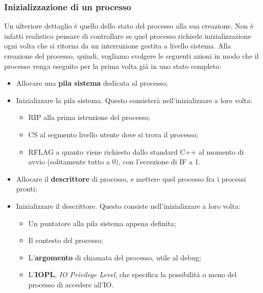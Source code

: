 \documentclass[a4paper,11pt]{article}
\begin{document}
\subsubsection{Inizializzazione di un processo}
Un ulteriore dettaglio è quello dello stato del processo alla sua creazione.
Non è infatti realistico pensare di controllare se quel processo richiede inizializzazione ogni volta che si ritorna da un interruzione gestita a livello sistema.
Alla creazione del processo, quindi, vogliamo svolgere le seguenti azioni in modo che il processo venga eseguito per la prima volta già in uno stato completo:
\begin{itemize}
	\item Allocare una \textbf{pila sistema} dedicata al processo;
	\item Inizializzare la pila sistema. Questo consisterà nell'inizializzare a loro volta: 
		\begin{itemize}
			\item RIP alla prima istruzione del processo;
			\item CS al segmento livello utente dove si trova il processo;
			\item RFLAG a quanto viene richiesto dallo standard C++ al momento di avvio (solitamente tutto a 0), con l'eccezione di IF a 1.
		\end{itemize}
	\item Allocare il \textbf{descrittore} di processo, e mettere quel processo fra i processi pronti;
	\item Inizializzare il descrittore. Questo consiste nell'inizializzare a loro volta:
		\begin{itemize}
			\item Un puntatore alla pila sistema appena definita;
			\item Il contesto del processo;
			\item L'\textbf{argomento} di chiamata del processo, utile al debug;
			\item L'\textbf{IOPL}, \textit{IO Privilege Level}, che specifica la possibilità o meno del processo di accedere all'IO.
		\end{itemize}
\end{itemize}
\end{document}

